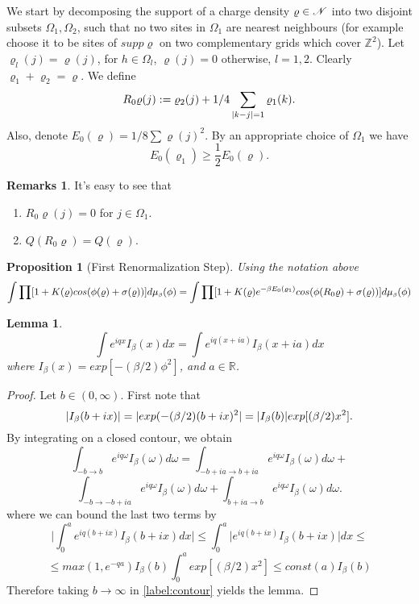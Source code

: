 \documentclass[11pt,reqno]{article}
\DeclarePairedDelimiter\abs{\lvert}{\rvert}%
\newtheorem{lemma}[thm]{Lemma}
\newtheorem{prop}[thm]{Proposition}
\theoremstyle{definition}
\newtheorem*{remarks}{Remarks}
\numberwithin{equation}{section}
\begin{document}
We start by decomposing the support of a charge density $\varrho \in \mathscr{N}$ into two disjoint subsets $\Omega_1, \Omega_2$, such that no two sites in $\Omega_1$ are nearest neighbours (for example choose it to be sites of $supp\varrho$ on two complementary grids which cover $\mathbb{Z}^2$). Let $\varrho_l(j) = \varrho(j)$, for $h \in \Omega_l$, $\varrho(j)=0$ otherwise, $l=1,2$. Clearly $\varrho_1 + \varrho_2 = \varrho$. We define
$$
R_0\varrho(j) := \varrho_2(j) + 1/4\sum_{\abs{k-j}=1}\varrho_1(k).
$$
Also, denote $E_0(\varrho) = 1/8\sum\varrho(j)^2$. By an appropriate choice of $\Omega_1$ we have
\begin{equation} \label{label:lab419}
E_0(\varrho_1) \geq \frac{1}{2} E_0(\varrho).
\end{equation}

\begin{remarks}
It's easy to see that
\begin{enumerate}
\item $R_0\varrho(j) = 0$ for $j\in\Omega_1$.
\item $Q(R_0\varrho) = Q(\varrho)$.
\end{enumerate}
\end{remarks}


\begin{prop}[First Renormalization Step] \label{prop:lem418}
Using the notation above
$$
\int \prod [1+K(\varrho)cos(\phi(\varrho) + \sigma(\varrho))] d\mu_{\text{\tiny$\beta$}}(\phi) = 
\int \prod [1+K(\varrho)e^{-\beta E_0(\varrho_1)}cos(\phi(R_0\varrho) + \sigma(\varrho))] d\mu_{\text{\tiny$\beta$}}(\phi)
$$
\end{prop}


\begin{lemma} \label{lemma:contour}
\begin{equation}
\int e^{i q x} I_\beta(x)dx = \int e^{i q (x+ia)} I_\beta(x+ia)dx
\end{equation}
where $I_\beta(x) = exp[-(\beta/2)\phi^2]$, and $a\in \mathbb{R}$.
\end{lemma}
\begin{proof}
Let $b \in (0,\infty)$. First note that 
$$
\abs{I_\beta(b+ix)} = \abs{exp(-(\beta/2) (b+ix)^2} = \abs{I_\beta(b)}exp[(\beta/2)x^2].
$$
By integrating on a closed contour, we obtain
$$
\int_{-b \rightarrow b} e^{i q \omega} I_\beta(\omega)d\omega =
\int_{-b+ia \rightarrow b+ia} e^{i q \omega} I_\beta(\omega)d\omega + 
$$
\begin{equation} \label{label:contour}
\int_{-b \rightarrow -b+ia} e^{i q \omega} I_\beta(\omega)d\omega +
\int_{b+ia \rightarrow b} e^{i q \omega} I_\beta(\omega)d\omega.
\end{equation}
where we can bound the last two terms by
$$
\Bigg| \int_0^a e^{iq(b+ix)}I_\beta(b+ix)dx \Bigg| \leq 
\int_0^a \Big| e^{iq(b+ix)}I_\beta(b+ix)\Big| dx \leq
$$
$$
\leq max(1, e^{-qa}) I_\beta(b) \int_0^a exp[(\beta/2)x^2] \leq const(a)I_\beta(b)
$$
Therefore taking $b\rightarrow\infty$ in \eqref{label:contour} yields the lemma.
\end{proof}
\end{document}
